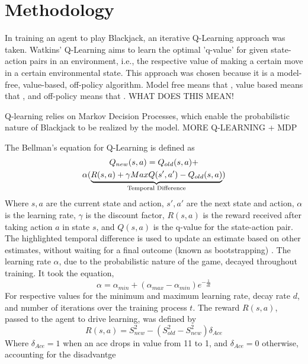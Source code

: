 \section{Methodology}

In training an agent to play Blackjack, an iterative Q-Learning approach was taken. Watkins' Q-Learning aims to learn the optimal 'q-value' for given state-action pairs in an environment, i.e., the respective value of making a certain move in a certain environmental state. This approach was chosen because it is a model-free, value-based, off-policy algorithm. Model free means that , value based means that  , and off-policy means that   .
WHAT DOES THIS MEAN!

Q-learning relies on Markov Decision Processes, which enable the probabilistic nature of Blackjack to be realized by the model. MORE Q-LEARNING + MDP

The Bellman's equation for Q-Learning is defined as
\begin{multline}
    Q_{new}(s,a)=Q_{old}(s,a)+\\\alpha(\underbrace{R(s,a)+\gamma MaxQ(s',a')-Q_{old}(s,a)}_{\mathclap{\text{Temporal Difference}}})
\end{multline}
Where \( s, a \) are the current state and action,  \( s', a' \) are the next state and action, \( \alpha \) is the learning rate, \( \gamma \) is the discount factor, \( R(s,a) \) is the reward received after taking action \( a \) in state \( s \), and \( Q(s,a) \) is the q-value for the state-action pair. The highlighted temporal difference is used to update an estimate based on other estimates, without waiting for a final outcome (known as bootstrapping) \cite{10.5555/3312046}. The learning rate \(\alpha\), due to the probabilistic nature of the game, decayed throughout training. It took the equation, 
\begin{equation}
    \alpha = \alpha_{min} + (\alpha_{max} - \alpha_{min})e^{-\frac{1}{dt}}
\end{equation}
For respective values for the minimum and maximum learning rate, decay rate \(d\), and number of iterations over the training process \(t\). The reward \(R(s,a)\), passed to the agent to drive learning, was defined by
\begin{equation} \label{reward}
    R(s,a) = S_{new}^2 - (S_{old}^2 - S_{new}^2)\delta_{Ace}
\end{equation}
Where \(\delta_{Ace}=1\) when an ace drops in value from 11 to 1, and \(\delta_{Ace}=0\) otherwise, accounting for the disadvantge 

